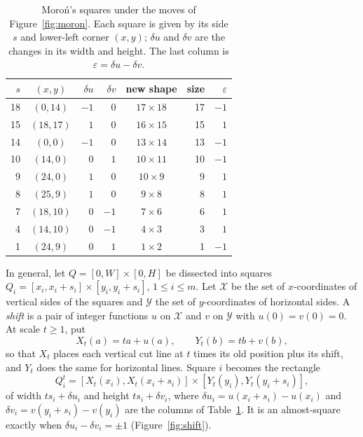 \documentclass[11pt]{amsart}
\theoremstyle{definition}
\begin{document}
\begin{table}[ht]
\caption{Moro\'n's squares under the moves of Figure~\ref{fig:moron}. Each square is given by its
side $s$ and lower-left corner $(x,y)$; $\delta u$ and $\delta v$ are the changes in its width and
height. The last column is $\varepsilon=\delta u-\delta v$.}
\label{tab:moron}
\centering\small
\begin{tabular}{rcrrcrr}
\toprule
$s$ & $(x,y)$ & $\delta u$ & $\delta v$ & new shape & size & $\varepsilon$\\
\midrule
18 & $(0,14)$ & $-1$ & $0$ & $17\times18$ & 17 & $-1$\\
15 & $(18,17)$ & $1$ & $0$ & $16\times15$ & 15 & $1$\\
14 & $(0,0)$ & $-1$ & $0$ & $13\times14$ & 13 & $-1$\\
10 & $(14,0)$ & $0$ & $1$ & $10\times11$ & 10 & $-1$\\
9 & $(24,0)$ & $1$ & $0$ & $10\times9$ & 9 & $1$\\
8 & $(25,9)$ & $1$ & $0$ & $9\times8$ & 8 & $1$\\
7 & $(18,10)$ & $0$ & $-1$ & $7\times6$ & 6 & $1$\\
4 & $(14,10)$ & $0$ & $-1$ & $4\times3$ & 3 & $1$\\
1 & $(24,9)$ & $0$ & $1$ & $1\times2$ & 1 & $-1$\\
\bottomrule
\end{tabular}
\end{table}

In general, let $Q=[0,W]\times[0,H]$ be dissected into squares $Q_i=[x_i,x_i+s_i]\times[y_i,y_i+s_i]$,
$1\le i\le m$. Let $\mathcal X$ be the set of $x$-coordinates of vertical sides of the squares and
$\mathcal Y$ the set of $y$-coordinates of horizontal sides. A \emph{shift} is a pair of integer
functions $u$ on $\mathcal X$ and $v$ on $\mathcal Y$ with $u(0)=v(0)=0$. At scale $t\ge1$, put
\[
X_t(a)=ta+u(a),\qquad Y_t(b)=tb+v(b),
\]
so that $X_t$ places each vertical cut line at $t$ times its old position plus its shift, and $Y_t$
does the same for horizontal lines. Square $i$ becomes the rectangle
\[
Q_i^t=[X_t(x_i),X_t(x_i+s_i)]\times[Y_t(y_i),Y_t(y_i+s_i)],
\]
of width $ts_i+\delta u_i$ and height $ts_i+\delta v_i$, where
$\delta u_i=u(x_i+s_i)-u(x_i)$ and $\delta v_i=v(y_i+s_i)-v(y_i)$ are the columns of
Table~\ref{tab:moron}. It is an almost-square exactly when $\delta u_i-\delta v_i=\pm1$
(Figure~\ref{fig:shift}).
\end{document}
